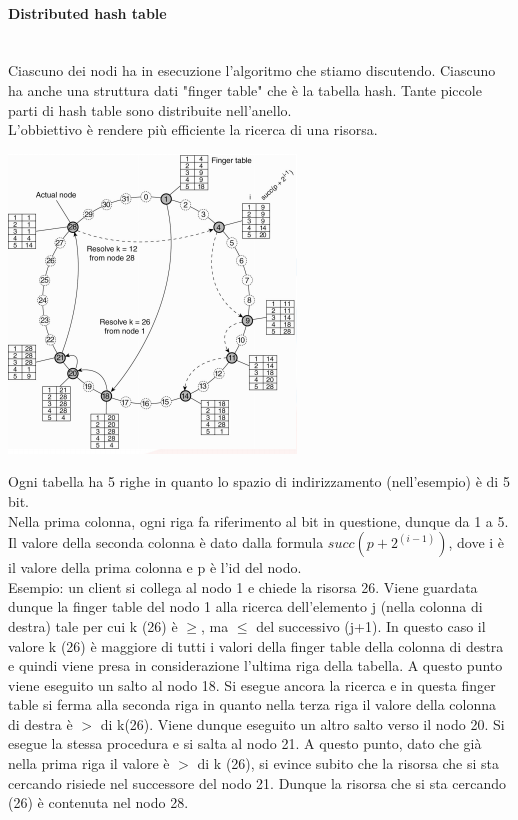 \paragraph{Distributed hash table}\mbox{}\\
Ciascuno dei nodi ha in esecuzione l'algoritmo che stiamo discutendo. Ciascuno ha anche una struttura dati "finger table" che è la tabella hash. Tante piccole parti di hash table sono distribuite nell'anello. \\
L'obbiettivo è rendere più efficiente la ricerca di una risorsa.\\
\begin{center}
    \includegraphics[width = .9\textwidth]{images/lezione2/DHT.png}
\end{center}
Ogni tabella ha 5 righe in quanto lo spazio di indirizzamento (nell'esempio) è di 5 bit.\\ 
Nella prima colonna, ogni riga fa riferimento al bit in questione, dunque da 1 a 5.
Il valore della seconda colonna è dato dalla formula \(succ(p + 2^{(i-1)})\), dove i è il valore della prima colonna e p è l'id del nodo.\\
Esempio: un client si collega al nodo 1 e chiede la risorsa 26. Viene guardata dunque la finger table del nodo 1 alla ricerca dell'elemento j (nella colonna di destra) tale per cui k (26) è \(\geq\), ma \(\leq\) del successivo (j+1). In questo caso il valore k (26) è maggiore di tutti i valori della finger table della colonna di destra e quindi viene presa in considerazione l'ultima riga della tabella. A questo punto viene eseguito un salto al nodo 18. Si esegue ancora la ricerca e in questa finger table si ferma alla seconda riga in quanto nella terza riga il valore della colonna di destra è \(>\) di k(26). Viene dunque eseguito un altro salto verso il nodo 20. Si esegue la stessa procedura e si salta al nodo 21. A questo punto, dato che già nella prima riga il valore è \(>\)
di k (26), si evince subito che la risorsa che si sta cercando risiede nel successore del nodo 21. Dunque la risorsa che si sta cercando (26) è contenuta nel nodo 28.


